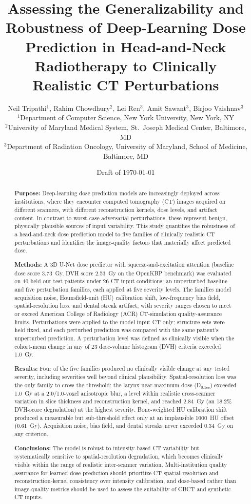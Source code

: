 \documentclass[11pt]{article}
\title{Assessing the Generalizability and Robustness of Deep-Learning Dose
Prediction in Head-and-Neck Radiotherapy to Clinically Realistic CT
Perturbations}
\author{
Neil Tripathi$^{1}$, Rahim Chowdhury$^{2}$, Lei Ren$^{3}$, Amit Sawant$^{3}$,
Birjoo Vaishnav$^{3}$\\[4pt]
\small $^{1}$Department of Computer Science, New York University, New York, NY\\
\small $^{2}$University of Maryland Medical System, St.\ Joseph Medical Center, Baltimore, MD\\
\small $^{3}$Department of Radiation Oncology, University of Maryland, School of Medicine, Baltimore, MD
}
\date{Draft of \today}
\begin{document}
\maketitle

\begin{abstract}
\noindent\textbf{Purpose:} Deep-learning dose prediction models are
increasingly deployed across institutions, where they encounter computed
tomography (CT) images acquired on different scanners, with different
reconstruction kernels, dose levels, and artifact content. In contrast to
worst-case adversarial perturbations, these represent benign, physically
plausible sources of input variability. This study quantifies the robustness
of a head-and-neck dose prediction model to five families of clinically
realistic CT perturbations and identifies the image-quality factors that
materially affect predicted dose.

\noindent\textbf{Methods:} A 3D U-Net dose predictor with
squeeze-and-excitation attention (baseline dose score 3.73~Gy, DVH score
2.53~Gy on the OpenKBP benchmark) was evaluated on 40 held-out test patients
under 26 CT input conditions: an unperturbed baseline and five perturbation
families, each applied at five severity levels. The families model
acquisition noise, Hounsfield-unit (HU) calibration shift, low-frequency bias
field, spatial-resolution loss, and dental streak artifact, with severity
ranges chosen to meet or exceed American College of Radiology (ACR)
CT-simulation quality-assurance limits. Perturbations were applied to the
model input CT only; structure sets were held fixed, and each perturbed
prediction was compared with the same patient's unperturbed prediction. A
perturbation level was defined as clinically visible when the cohort-mean
change in any of 23 dose-volume histogram (DVH) criteria exceeded 1.0~Gy.

\noindent\textbf{Results:} Four of the five families produced no clinically
visible change at any tested severity, including severities well beyond
clinical plausibility. Spatial-resolution loss was the only family to cross
the threshold: the larynx near-maximum dose (D$_{0.1\mathrm{cc}}$) exceeded
1.0~Gy at a 2.0/1.0-voxel anisotropic blur, a level within realistic
cross-scanner variation in slice thickness and reconstruction kernel, and
reached 2.84~Gy (an 18.2\% DVH-score degradation) at the highest severity.
Bone-weighted HU calibration shift produced a measurable but sub-threshold
effect only at an implausible 1000~HU offset (0.61~Gy). Acquisition noise,
bias field, and dental streaks never exceeded 0.34~Gy on any criterion.

\noindent\textbf{Conclusions:} The model is robust to intensity-based CT
variability but systematically sensitive to spatial-resolution degradation,
which becomes clinically visible within the range of realistic inter-scanner
variation. Multi-institution quality assurance for learned dose prediction
should prioritize CT spatial-resolution and reconstruction-kernel
consistency over intensity calibration, and dose-based rather than
image-quality metrics should be used to assess the suitability of CBCT and
synthetic CT inputs.
\end{abstract}
\end{document}

